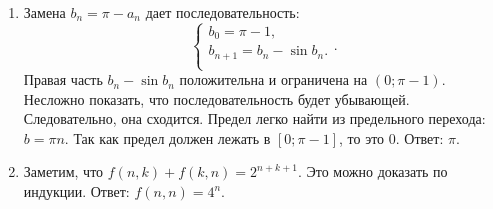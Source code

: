\documentclass[11pt, a4paper]{article}
\begin{document}
\begin{enumerate}
\item Замена $b_n = \pi - a_n$ дает последовательность: 
$$
\begin{cases}
b_0 = \pi - 1,\\
b_{n+1} = b_n - \sin{b_n}.\\
\end{cases}. 
$$
Правая часть $b_n - \sin{b_n}$ положительна и ограничена на $(0; \pi - 1)$. Несложно показать, что последовательность будет убывающей. Следовательно, она сходится. Предел легко найти из предельного перехода: $b = \pi n$. Так как предел должен лежать в $[0; \pi - 1]$, то это 0. Ответ: $\pi$.

\item Заметим, что $f(n, k) + f(k, n) = 2^{n + k + 1}$. Это можно доказать по индукции. Ответ: $f(n, n) = 4^n$.
\end{enumerate}
\end{document}
